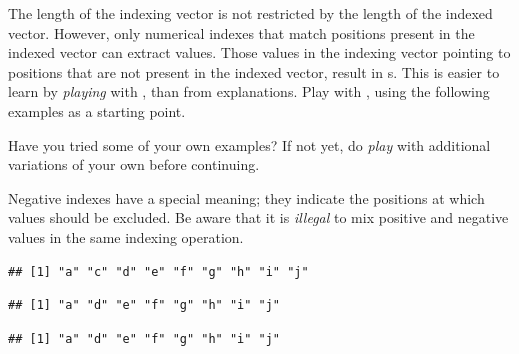 \documentclass[krantz2]{krantz}\usepackage{knitr}
\begin{document}
\begin{playground}
The length of the indexing vector is not restricted by the length of the indexed vector. However, only numerical indexes that match positions present in the indexed vector can extract values. Those values in the indexing vector pointing to positions that are not present in the indexed vector, result in s. This is easier to learn by \emph{playing} with \Rlang, than from explanations. Play with \Rlang, using the following examples as a starting point.

\begin{knitrout}\footnotesize
{}\color{fgcolor}\begin{kframe}
\begin{alltt}
\hlstd{a[}\hlstd{(}\hlstd{,}\hlstd{,}\hlstd{,}\hlstd{)]}
\hlstd{a[}\hlstd{(}\hlopt{:}\hlstd{,} \hlopt{:}\hlstd{)]}
\hlstd{a[}\hlstd{(}\hlstd{,}\hlstd{)]}
\hlstd{a[}\hlstd{]}
\end{alltt}
\end{kframe}
\end{knitrout}

Have you tried some of your own examples? If not yet, do \emph{play} with additional variations of your own before continuing.

\end{playground}

Negative indexes have a special meaning; they indicate the positions at which values should be excluded. Be aware that it is \emph{illegal} to mix positive and negative values in the same indexing operation.

\begin{knitrout}\footnotesize
{}\color{fgcolor}\begin{kframe}
\begin{alltt}
\hlstd{a[}\hlopt{-}\hlstd{]}
\end{alltt}
\begin{verbatim}
## [1] "a" "c" "d" "e" "f" "g" "h" "i" "j"
\end{verbatim}
\begin{alltt}
\hlstd{a[}\hlopt{-}\hlstd{(}\hlstd{,}\hlstd{)]}
\end{alltt}
\begin{verbatim}
## [1] "a" "d" "e" "f" "g" "h" "i" "j"
\end{verbatim}
\begin{alltt}
\hlstd{a[}\hlopt{-}\hlopt{:-}\hlstd{]}
\end{alltt}
\begin{verbatim}
## [1] "a" "d" "e" "f" "g" "h" "i" "j"
\end{verbatim}
\end{kframe}
\end{knitrout}
\end{document}
